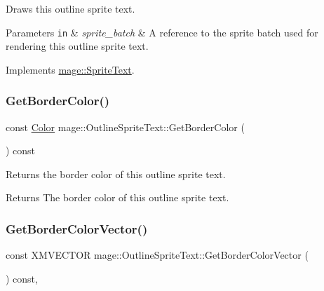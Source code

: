 Draws this outline sprite text.


\begin{DoxyParams}[1]{Parameters}
\mbox{\tt in}  & {\em sprite\+\_\+batch} & A reference to the sprite batch used for rendering this outline sprite text. \\
\hline
\end{DoxyParams}


Implements \hyperlink{classmage_1_1_sprite_text_a45d5ac8410d5a46b26e8491946a2ad9e}{mage\+::\+Sprite\+Text}.

\hypertarget{classmage_1_1_outline_sprite_text_adb4936119bcc0b148c9e11f021e83940}{}\label{classmage_1_1_outline_sprite_text_adb4936119bcc0b148c9e11f021e83940} 
\subsubsection{\texorpdfstring{Get\+Border\+Color()}{GetBorderColor()}}
{\footnotesize\ttfamily const \hyperlink{structmage_1_1_color}{Color} mage\+::\+Outline\+Sprite\+Text\+::\+Get\+Border\+Color (\begin{DoxyParamCaption}{ }\end{DoxyParamCaption}) const\hspace{0.3cm}{\ttfamily [noexcept]}}

Returns the border color of this outline sprite text.

\begin{DoxyReturn}{Returns}
The border color of this outline sprite text. 
\end{DoxyReturn}
\hypertarget{classmage_1_1_outline_sprite_text_a287bef30662bbd00ca999b3577249226}{}\label{classmage_1_1_outline_sprite_text_a287bef30662bbd00ca999b3577249226} 
\subsubsection{\texorpdfstring{Get\+Border\+Color\+Vector()}{GetBorderColorVector()}}
{\footnotesize\ttfamily const X\+M\+V\+E\+C\+T\+OR mage\+::\+Outline\+Sprite\+Text\+::\+Get\+Border\+Color\+Vector (\begin{DoxyParamCaption}{ }\end{DoxyParamCaption}) const\hspace{0.3cm}{\ttfamily [private]}, {\ttfamily [noexcept]}}

